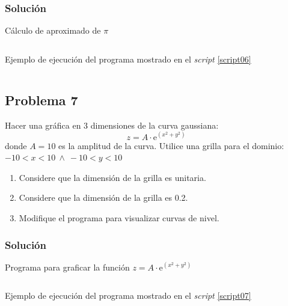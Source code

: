 \documentclass[a4paper,12pt,final]{article}
\begin{document}
    \subsubsection*{Solución}
      \begin{listing}[H]
        \caption{Cálculo de aproximado de $\pi$}
        \label{script06}
        \inputminted[firstline=5]{matlab}{./laboratorio_1/problema06.m}
      \end{listing}

      \begin{listing}[H]
        \caption{Ejemplo de ejecución del programa mostrado en el
        \emph{script} \ref{script06}}
        \label{script06sample}
        \inputminted{text}{./laboratorio_1/problema06_sample.txt}
      \end{listing}
      \vspace{\fill}

  \newpage
  \subsection*{Problema 7}
    \noindent Hacer una gráfica en 3 dimensiones de la curva gaussiana:
    $$z = A \cdot \mathrm{e}^{\left(x^2 + y^2\right)}$$
    donde $A=10$ es la amplitud de la curva. Utilice una grilla para el
    dominio: $-10 < x < 10\ \wedge\ -10 < y < 10$

    \begin{enumerate}
      \item Considere que la dimensión de la grilla es unitaria.
      \item Considere que la dimensión de la grilla es 0.2.
      \item Modifique el programa para visualizar curvas de nivel.
    \end{enumerate}

    \subsubsection*{Solución}
      \begin{listing}[H]
        \caption{Programa para graficar la función $z = A \cdot \mathrm{e}^{\left(x^2 + y^2\right)}$}
        \label{script07}
        \inputminted[firstline=5]{matlab}{./laboratorio_1/problema07.m}
      \end{listing}

      \begin{listing}[H]
        \caption{Ejemplo de ejecución del programa mostrado en el
        \emph{script} \ref{script07}}
        \label{script07sample}
        \inputminted{text}{./laboratorio_1/problema07_sample.txt}
      \end{listing}
\end{document}
